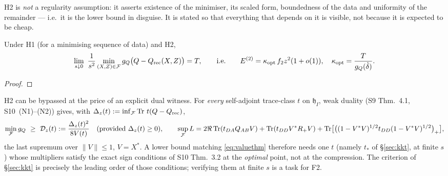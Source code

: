 \documentclass[11pt]{article}
\newcommand{\hh}{\mathfrak h}
\begin{document}
H2 is \emph{not} a regularity assumption: it asserts existence of the minimiser, its scaled
form, boundedness of the data and uniformity of the remainder --- i.e.\ it is the lower
bound in disguise.  It is stated so that everything that depends on it is visible, not
because it is expected to be cheap.

\begin{theorem}\label{thm:value}
Under H1 (for a minimising sequence of data) and H2,
\begin{equation}\label{eq:valuethm}
 \lim_{s\downarrow0}\ \frac{1}{s^2}\min_{(X,Z)\in\mathcal F}g_Q\bigl(Q-Q_{\rm rec}(X,Z)\bigr)=T,
 \qquad\text{i.e.}\qquad E^{(2)}=\kappa_{\rm opt}\,f_2z^2(1+o(1)),\quad
 \kappa_{\rm opt}=\frac{T}{g_Q(\dot\delta)} .
\end{equation}
\end{theorem}
\begin{proof}
\end{proof}

\begin{remark}\label{rem:dual}
H2 can be bypassed at the price of an explicit dual witness.  For \emph{every} self-adjoint
trace-class $t$ on $\hh_I$, weak duality (S9 Thm.~4.1, S10~(N1)--(N2)) gives, with
$\Delta_z(t):=\inf_\mathcal F\operatorname{Tr}\,t(Q-Q_{\rm rec})$,
\begin{equation}\label{eq:weakdual}
 \min_{\mathcal F}g_Q\ \ge\ \mathcal D_z(t):=\frac{\Delta_z(t)^2}{8V(t)}\quad(\text{provided }\Delta_z(t)\ge0),\qquad
 \sup_\mathcal F L=2\Re\operatorname{Tr}(t_{DA}Q_{AB}V)+\operatorname{Tr}(t_{DD}V^*R_+V)
  +\operatorname{Tr}\bigl[\bigl((1-V^*V)^{1/2}t_{DD}(1-V^*V)^{1/2}\bigr)_+\bigr],
\end{equation}
the last supremum over $\|V\|\le1$, $V=X^*$.  A lower bound matching \eqref{eq:valuethm}
therefore needs one $t$ (namely $t_*$ of \S\ref{sec:kkt}, at finite $s$) whose multipliers
satisfy the exact sign conditions of S10 Thm.~3.2 at the \emph{optimal} point, not at the
compression.  The criterion of \S\ref{sec:kkt} is precisely the leading order of those
conditions; verifying them at finite $s$ is a task for F2.
\end{remark}
\end{document}
